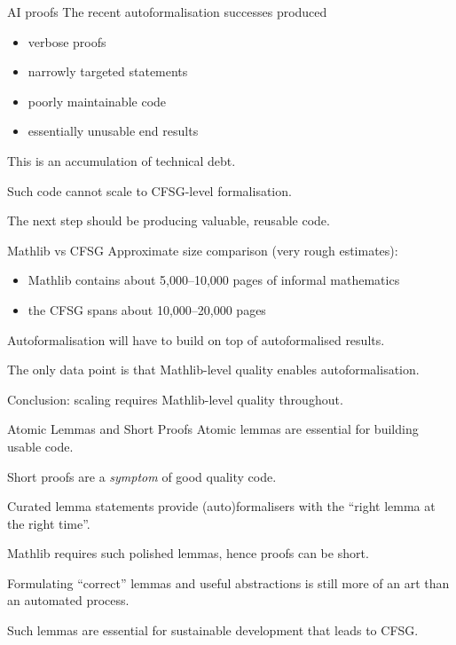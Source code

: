 \documentclass{beamer}
\begin{document}
\begin{frame}{AI proofs}
The recent autoformalisation successes produced

\medskip

\begin{itemize}
  \item verbose proofs
  \item narrowly targeted statements
  \item poorly maintainable code
  \item essentially unusable end results
\end{itemize}

\bigskip

This is an accumulation of technical debt.

\bigskip

Such code cannot scale to CFSG-level formalisation.

\bigskip

The next step should be producing valuable, reusable code.
\end{frame}

\begin{frame}{Mathlib vs CFSG}
Approximate size comparison (very rough estimates):

\medskip

\begin{itemize}
  \item Mathlib contains about 5,000--10,000 pages of informal mathematics
  \vspace{3pt}
  \item the CFSG spans about 10,000--20,000 pages
\end{itemize}

\bigskip

Autoformalisation will have to build on top of autoformalised results.

\bigskip

The only data point is that Mathlib-level quality enables autoformalisation.

\bigskip

Conclusion: scaling requires Mathlib-level quality throughout.
\end{frame}

\begin{frame}{Atomic Lemmas and Short Proofs}
Atomic lemmas are essential for building usable code.

\bigskip

Short proofs are a \emph{symptom} of good quality code.

\bigskip

Curated lemma statements provide (auto)formalisers with the ``right lemma at the right time''.

\bigskip

Mathlib requires such polished lemmas, hence proofs can be short.

\bigskip

Formulating ``correct'' lemmas and useful abstractions is still more of an art than an automated process.

\bigskip

Such lemmas are essential for sustainable development that leads to CFSG.
\end{frame}
\end{document}
